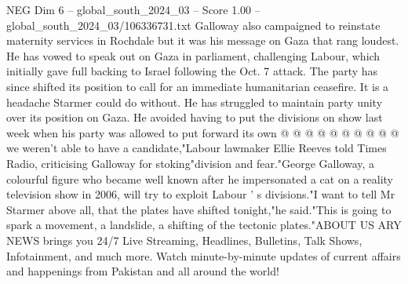 \begin{textsample}{NEG Dim 6 – global\_south\_2024\_03 – Score 1.00 – global\_south\_2024\_03/106336731.txt}
Galloway also campaigned to reinstate maternity services in Rochdale but it was his message on Gaza that rang loudest.
He has vowed to speak out on Gaza in parliament, challenging Labour, which initially gave full backing to Israel following the Oct. 7 attack.
The party has since shifted its position to call for an immediate humanitarian ceasefire.
It is a headache Starmer could do without.
He has struggled to maintain party unity over its position on Gaza.
He avoided having to put the divisions on show last week when his party was allowed to put forward its own @ @ @ @ @ @ @ @ @ @ we weren't able to have a candidate,"Labour lawmaker Ellie Reeves told Times Radio, criticising Galloway for stoking"division and fear."George Galloway, a colourful figure who became well known after he impersonated a cat on a reality television show in 2006, will try to exploit Labour ' s divisions."I want to tell Mr Starmer above all, that the plates have shifted tonight,"he said."This is going to spark a movement, a landslide, a shifting of the tectonic plates."ABOUT US ARY NEWS brings you 24/7 Live Streaming, Headlines, Bulletins, Talk Shows, Infotainment, and much more.
Watch minute-by-minute updates of current affairs and happenings from Pakistan and all around the world!

\end{textsample}

